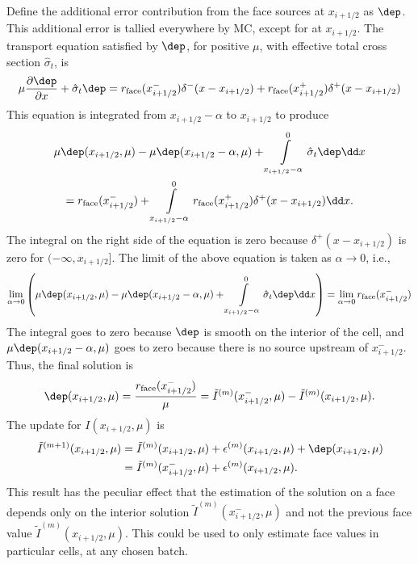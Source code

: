 Define the additional error contribution 
from the face sources at $x_{i+1/2}$ as $\dep$.  This additional error is tallied
everywhere by MC, except for at $x_{i+1/2}$.  The transport equation satisfied by $\dep$, for positive
$\mu$, with effective total cross 
section $\hat \sigma_t$, is
\begin{equation}
    \label{eq:ho_face}
    \mu \pderiv{\dep}{x} + \hat\sigma_t \dep = \rface(x_{i+1/2}^-)\delta^-(x - x_{i+1/2}) + \rface(x_{i+1/2}^+)\delta^+(x - x_{i+1/2}) 
\end{equation}
This equation is integrated from $x_{i+1/2}-\alpha$ to $x_{i+1/2}$ to produce
\begin{multline}
    \mu\dep(x_{i+1/2},\mu) - \mu\dep(x_{i+1/2}-\alpha,\mu)  + \int\limits_{x_{i+1/2}-\alpha}^0 
    \hat \sigma_t \dep \dd x  \\ =  \rface(x_{i+1/2}^-) +
        \int\limits_{x_{i+1/2}-\alpha}^0\rface(x_{i+1/2}^+)\delta^+(x - x_{i+1/2}) \dd x.
\end{multline}
The integral on the right side of the equation is zero because $\delta^+(x-x_{i+1/2})$ is
zero for $(-\infty,x_{i+1/2}]$.  The limit of the above equation is taken as $\alpha\to0$, i.e.,
\begin{multline}
    \lim_{\alpha\to0}\left( \mu\dep(x_{i+1/2},\mu) - \mu\dep(x_{i+1/2}-\alpha,\mu)  + \int\limits_{x_{i+1/2}-\alpha}^0 
    \hat \sigma_t \dep \dd x \right)  = \lim_{\alpha\to0} \rface(x_{i+1/2}^-) 
\end{multline}
The integral goes to zero because $\dep$ is smooth on the interior of the cell, and
$\mu\dep(x_{i+1/2}-\alpha,\mu)$ goes to zero because there is no source upstream of
$x_{i+1/2}^-$. Thus, the final solution is
\begin{equation}
    \dep(x_{i+1/2},\mu) = \frac{\rface(x_{i+1/2}^-)}{\mu} = 
     \tilde I^{(m)}(x_{i+1/2}^-,\mu) - \tilde I^{(m)}(x_{i+1/2},\mu)
.
\end{equation}
The update for $I(x_{i+1/2},\mu)$ is 
\begin{align}
   \tilde I^{(m+1)}(x_{i+1/2},\mu) &= \tilde I^{(m)}(x_{i+1/2},\mu) + \epsilon^{(m)}(x_{i+1/2},\mu) +
    \dep(x_{i+1/2},\mu) \\ 
        &= \tilde I^{(m)}(x_{i+1/2}^-,\mu) + \epsilon^{(m)}(x_{i+1/2},\mu).
\end{align}
This result has the peculiar effect that the estimation of the solution on a face depends only on
the interior solution $\tilde I^{(m)}(x_{i+1/2}^-,\mu)$ and not the previous face value 
$\tilde I^{(m)}(x_{i+1/2},\mu)$. This could be used to only estimate
face values in particular cells, at any chosen batch.



